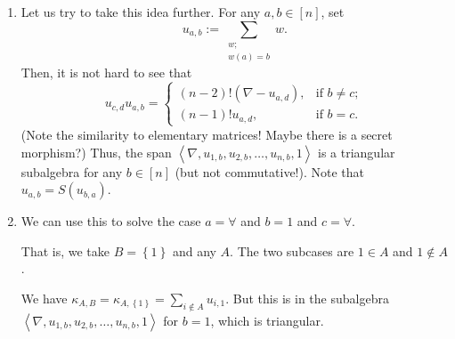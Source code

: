 \documentclass[numbers=enddot,12pt,final,onecolumn,notitlepage]{scrartcl}%
\numberwithin{exer}{subsection}
\theoremstyle{definition}
\let\sumnonlimits\sum
\renewcommand{\sum}{\sumnonlimits\limits}
\newenvironment{noncompile}{}{}
\begin{document}
\begin{noncompile}
\begin{enumerate}
Thus, the list $\left(  \nabla,\rho,1\right)  $ is triangular. More generally,
any list of the form $\left(  \nabla,b_{1},b_{2},\ldots,b_{k},1\right)  $ is
triangular if we have
\[
b_{i}b_{j}\in\left\langle \nabla,b_{1},b_{2},\ldots,b_{j}\right\rangle
\ \ \ \ \ \ \ \ \ \ \text{for all }i,j\in\left[  k\right]
\]
(because $\nabla u$ and $u\nabla$ are always scalar multiples of $\nabla$).

\item Let us try to take this idea further. For any $a,b\in\left[  n\right]
$, set
\[
u_{a,b}:=\sum_{\substack{w;\\w\left(  a\right)  =b}}w.
\]
Then, it is not hard to see that%
\[
u_{c,d}u_{a,b}=%
\begin{cases}
\left(  n-2\right)  !\left(  \nabla-u_{a,d}\right)  , & \text{if }b\neq c;\\
\left(  n-1\right)  !u_{a,d}, & \text{if }b=c.
\end{cases}
\]
(Note the similarity to elementary matrices! Maybe there is a secret
morphism?) Thus, the span $\left\langle \nabla,u_{1,b},u_{2,b},\ldots
,u_{n,b},1\right\rangle $ is a triangular subalgebra for any $b\in\left[
n\right]  $ (but not commutative!). Note that $u_{a,b}=S\left(  u_{b,a}%
\right)  $.

\item We can use this to solve the case $a=\forall$ and $b=1$ and $c=\forall$.

That is, we take $B=\left\{  1\right\}  $ and any $A$. The two subcases are
$1\in A$ and $1\notin A$.

We have $\kappa_{A,B}=\kappa_{A,\left\{  1\right\}  }=\sum_{i\notin A}u_{i,1}%
$. But this is in the subalgebra $\left\langle \nabla,u_{1,b},u_{2,b}%
,\ldots,u_{n,b},1\right\rangle $ for $b=1$, which is triangular.


\end{enumerate}
\end{noncompile}
\end{document}
